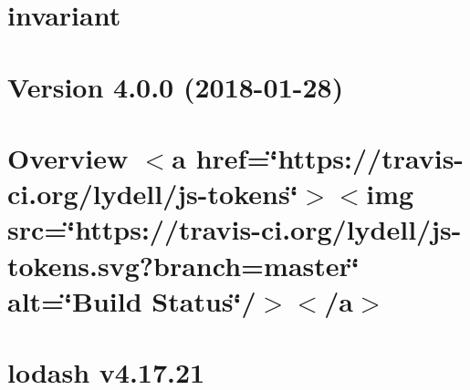 \let\mypdfximage\pdfximage\def\pdfximage{\immediate\mypdfximage}\documentclass[twoside]{book}
\newcommand{\+}{\discretionary{\mbox{\scriptsize$\hookleftarrow$}}{}{}}
\begin{document}
\chapter{invariant}
\label{md__c___users_zhart__one_drive__desktop_school_capstone_workspace_capstone_flight_risk_assesment79925e6057c417c6d35b5ac2c1b21d3d}

\chapter{Version 4.0.0 (2018-\/01-\/28)}
\label{md__c___users_zhart__one_drive__desktop_school_capstone_workspace_capstone_flight_risk_assesment3bbf1984738b46fb1e55f0e2a3055aa8}

\chapter{Overview $<$a href=\char`\"{}https\+://travis-\/ci.\+org/lydell/js-\/tokens\char`\"{}$>$$<$img src=\char`\"{}https\+://travis-\/ci.\+org/lydell/js-\/tokens.\+svg?branch=master\char`\"{} alt=\char`\"{}\+Build Status\char`\"{}/$>$$<$/a$>$}
\label{md__c___users_zhart__one_drive__desktop_school_capstone_workspace_capstone_flight_risk_assesmentd8c92282a05156857f9288244751dcdd}

\chapter{lodash v4.17.21}
\label{md__c___users_zhart__one_drive__desktop_school_capstone_workspace_capstone_flight_risk_assesment28fdc581fa9e07c55da86e41e0ac8a90}

\end{document}
